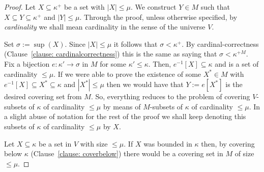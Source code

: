 \documentclass[11pt]{amsart}
\theoremstyle{definition}
\theoremstyle{remark}
\def\s{\subseteq}
\newcommand\tom[1]{\marginpar{Tom: #1}}
\newcommand\ale[1]{\marginpar{Alejandro: #1}}
\begin{document}
\begin{proof}
    Let $X\s \kappa^+$ be a set with $|X|\leq \mu$. We construct  $Y\in M$ such that $X\s Y\s \kappa^+$ and $|Y|\leq \mu$. %
    Through the proof, unless otherwise specified, by \emph{cardinality} we shall mean cardinality in the sense of the universe $V$.

   
   Set $\sigma:=\sup(X)$. Since $|X|\leq \mu$ it follows that $\sigma < \kappa^+$. By cardinal-correctness (Clause~\eqref{clause: cardinalcorrectness}) this is the same as saying that $\sigma<\kappa^{+M}$. Fix a bijection $e\colon \kappa' \rightarrow \sigma$ in $M$ for some $\kappa'\leq \kappa$. Then, $e^{-1}[X]\s \kappa$ and is a set of cardinality $\leq\mu$. %
    If we were able to prove the existence of some $X^*\in M$ with $e^{-1}[X]\s X^*\s \kappa$ and $|X^*|\leq \mu$ then we would have that $Y:=e[X^*]$ is the desired covering set from $M$.  So, everything reduces to the problem of covering $V$-subsets of $\kappa$ of cardinality ${\leq}\mu$ by means of $M$-subsets of $\kappa$  of cardinality ${\leq \mu}$. In a slight abuse of notation for the rest of the proof we shall keep denoting this subsets of $\kappa$ of cardinality ${\leq}\mu$ by $X$.

    \smallskip



    Let $X\s \kappa$ be a set in $V$ with size ${\leq}\mu$. If $X$ was bounded in $\kappa$ then, by covering below $\kappa$ (Clause~\eqref{clause: coverbelow}) there would be a covering set in $M$ of size ${\leq}\mu$.


\end{proof}
\end{document}
